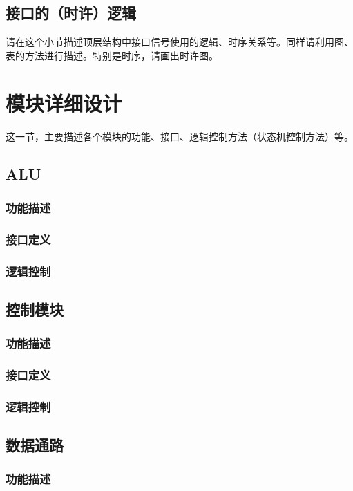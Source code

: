 \documentclass[a4paper]{article}
\begin{document}
\subsection{接口的（时许）逻辑}\label{sub:logicinter}
请在这个小节描述顶层结构中接口信号使用的逻辑、时序关系等。同样请利用图、表的方法进行描述。特别是时序，请画出时许图。
\section{模块详细设计}
这一节，主要描述各个模块的功能、接口、逻辑控制方法（状态机控制方法）等。
\subsection{ALU}\label{sub:alu}
\subsubsection{功能描述}
\subsubsection{接口定义}
\subsubsection{逻辑控制}

\subsection{控制模块}\label{sub:ctl}
\subsubsection{功能描述}
\subsubsection{接口定义}
\subsubsection{逻辑控制}

\subsection{数据通路}\label{sub:dat}
\subsubsection{功能描述}
\end{document}
